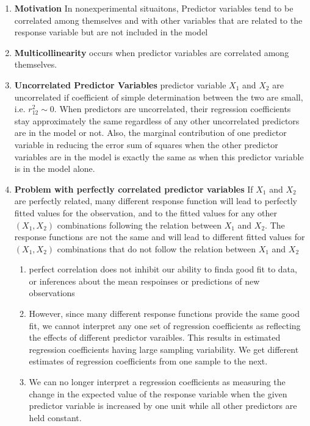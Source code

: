 \documentclass[11pt]{article}
\begin{document}
\begin{enumerate}
    \item \textbf{Motivation} In nonexperimental situaitons, Predictor variables tend to be correlated among themselves and with other variables that are related to the response variable but are not included in the model
    \item \textbf{Multicollinearity} occurs when predictor variables are correlated among themselves. 
    \item \textbf{Uncorrelated Predictor Variables} predictor variable $X_1$ and $X_2$ are uncorrelated if coefficient of simple determination between the two are small, i.e. $r^2_{12} \sim 0$. When predictors are uncorrelated, their regression coefficients stay approximately the same regardless of any other uncorrelated predictors are in the model or not. Also, the marginal contribution of one predictor variable in reducing the error sum of squares when the other predictor variables are in the model is exactly the same as when this predictor variable is in the model alone. 
    \item \textbf{Problem with perfectly correlated predictor variables} If $X_1$ and $X_2$ are perfectly related, many different response function will lead to perfectly fitted values for the observation, and to the fitted values for any other $(X_1, X_2)$ combinations following the relation between $X_1$ and $X_2$. The response functions are not the same and will lead to different fitted values for $(X_1, X_2)$ combinations that do not follow the relation between $X_1$ and $X_2$
    \begin{enumerate}
        \item perfect correlation does not inhibit our ability to finda  good fit to data, or inferences about the mean respoinses or predictions of new observations 
        \item However, since many different response functions provide the same good fit, we cannot interpret any one set of regression coefficients as reflecting the effects of different predictor varaibles. This results in estimated regression coefficients having large sampling variability. We get different estimates of regression coefficients from one sample to the next. 
        \item We can no longer interpret a regression coefficients as measuring the change in the expected value of the response variable when the given predictor variable is increased by one unit while all other predictors are held constant. 
    \end{enumerate}

\end{enumerate}
\end{document}

